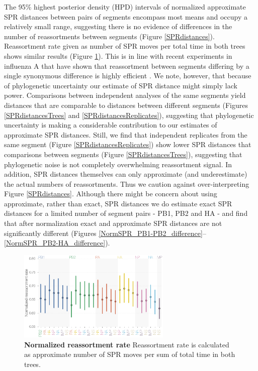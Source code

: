 \documentclass[11pt,oneside,letterpaper]{article}
\begin{document}
The 95\% highest posterior density (HPD) intervals of normalized approximate SPR distances between pairs of segments encompass most means and occupy a relatively small range, suggesting there is no evidence of differences in the number of reassortments between segments (Figure \ref{SPRdistances}).
Reassortment rate given as number of SPR moves per total time in both trees shows similar results (Figure \ref{NormSPR_RErate}).
This is in line with recent experiments in influenza A that have shown that reassortment between segments differing by a single synonymous difference is highly efficient \citep{marshall2013}.
We note, however, that because of phylogenetic uncertainty our estimate of SPR distance might simply lack power.
Comparisons between independent analyses of the same segments yield distances that are comparable to distances between different segments (Figures \ref{SPRdistancesTrees} and \ref{SPRdistancesReplicates}), suggesting that phylogenetic uncertainty is making a considerable contribution to our estimates of approximate SPR distances.
Still, we find that independent replicates from the same segment (Figure \ref{SPRdistancesReplicates}) show lower SPR distances that comparisons between segments (Figure \ref{SPRdistancesTrees}), suggesting that phylogenetic noise is not completely overwhelming reassortment signal.
In addition, SPR distances themselves can only approximate (and underestimate) the actual numbers of reassortments.
Thus we caution against over-interpreting Figure \ref{SPRdistances}.
Although there might be concern about using approximate, rather than exact, SPR distances we do estimate exact SPR distances for a limited number of segment pairs - PB1, PB2 and HA - and find that after normalization exact and approximate SPR distances are not significantly different (Figures \ref{NormSPR_PB1-PB2_difference}--\ref{NormSPR_PB2-HA_difference}).


\begin{figure}
\centering  
\includegraphics[width=0.65\textwidth]  {supp_figures/InfB_supp_normRErate.png}
\caption{\textbf{Normalized reassortment rate}
Reassortment rate is calculated as approximate number of SPR moves per sum of total time in both trees.}
\label{NormSPR_RErate}
\end{figure}
\end{document}
